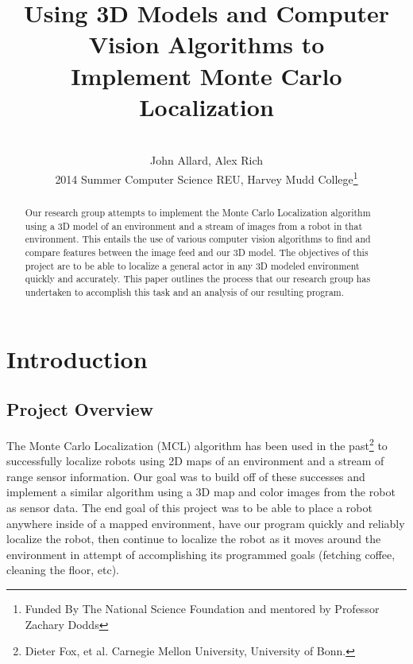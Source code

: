 \documentclass[a4paper,11pt]{article}
\title{Using 3D Models and Computer Vision Algorithms to \\ Implement Monte Carlo Localization}
\author{ \\[7in]  John Allard, Alex Rich \\ 2014 Summer Computer Science REU, Harvey Mudd College\thanks{Funded By The National Science Foundation and mentored by Professor Zachary Dodds}}
\begin{document}
  \maketitle   
  \newpage  
  
  \tableofcontents
  \newpage

  \begin{abstract}  
  Our research group attempts to implement the Monte Carlo Localization algorithm using a 3D model of an environment and a stream of images from a robot in that environment. This entails the use of various computer vision algorithms to find and compare features between the image feed and our 3D model. The objectives of this project are to be able to localize a general actor in any 3D modeled environment quickly and accurately. This paper outlines the process that our research group has undertaken to accomplish this task and an analysis of our resulting program. 
  \end{abstract}
  
















  \section{Introduction} 

  \subsection{Project Overview}
  The Monte Carlo Localization (MCL) algorithm has been used in the past\footnote{ Dieter Fox, et al. Carnegie Mellon University, University of Bonn.} to successfully localize robots using 2D maps of an environment and a stream of range sensor information. Our goal was to build off of these successes and implement a similar algorithm using a 3D map and color images from the robot as sensor data. The end goal of this project was to be able to place a robot anywhere inside of a mapped environment, have our program quickly and reliably localize the robot, then continue to localize the robot as it moves around the environment in attempt of accomplishing its programmed goals (fetching coffee, cleaning the floor, etc).
\end{document}
